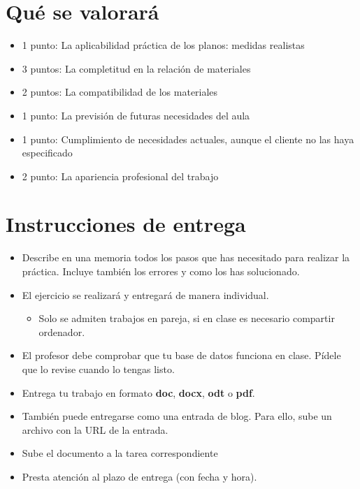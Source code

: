 \section{Qué se valorará}
\begin{itemize}
\item 1 punto: La aplicabilidad práctica de los planos: medidas realistas
\item 3 puntos: La completitud en la relación de materiales
\item 2 puntos: La compatibilidad de los materiales
\item 1 punto: La previsión de futuras necesidades del aula
\item 1 punto: Cumplimiento de necesidades actuales, aunque el cliente no las haya especificado
\item 2 punto: La apariencia profesional del trabajo
\end{itemize}

\section{Instrucciones de entrega}
\begin{itemize}
\item Describe en una memoria todos los pasos que has necesitado para realizar la práctica. Incluye también los errores y como los has solucionado.
\item El ejercicio se realizará y entregará de manera individual.
  \begin{itemize}
  \item Solo se admiten trabajos en pareja, si en clase es necesario compartir ordenador.
  \end{itemize}
\item El profesor debe comprobar que tu base de datos funciona en clase. Pídele que lo revise cuando lo tengas listo.
\item Entrega tu trabajo en formato \textbf{doc}, \textbf{docx}, \textbf{odt} o \textbf{pdf}.
\item También puede entregarse como una entrada de blog. Para ello, sube un archivo con la URL de la entrada.
\item Sube el documento a la tarea correspondiente 
\item Presta atención al plazo de entrega (con fecha y hora).
  
\end{itemize}

